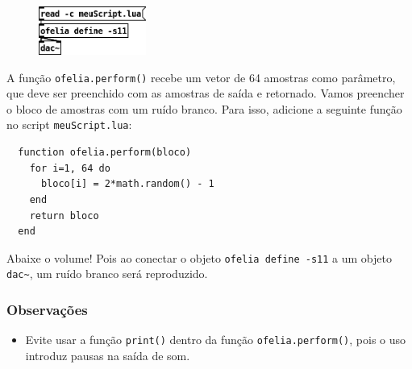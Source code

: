 \documentclass{article}
\begin{document}
\begin{figure}[H]
  \centering
  \includegraphics[width=100pt]{perform.png}
\end{figure}

A função \texttt{ofelia.perform()} recebe um vetor de 64 amostras como parâmetro, que deve ser preenchido com as amostras de saída e retornado.
Vamos preencher o bloco de amostras com um ruído branco. Para isso, adicione a seguinte função no script \texttt{meuScript.lua}:

\begin{center}
  \begin{lstlisting}
  function ofelia.perform(bloco)
    for i=1, 64 do
      bloco[i] = 2*math.random() - 1
    end
    return bloco
  end
  \end{lstlisting}
\end{center}

Abaixe o volume! Pois ao conectar o objeto \texttt{ofelia define -s11} a um objeto \texttt{dac\textasciitilde}, um ruído branco será reproduzido.

\subsubsection{Observações}

\begin{itemize}
  \item Evite usar a função \texttt{print()} dentro da função \texttt{ofelia.perform()}, pois o uso introduz pausas na saída de som.
\end{itemize}

\end{document}
